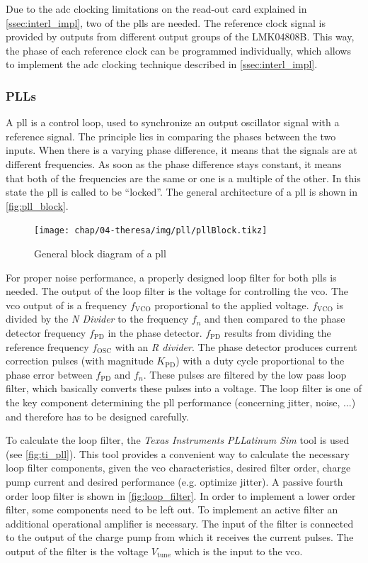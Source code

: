 Due to the \gls{adc} clocking limitations on the read-out card explained in \autoref{ssec:interl_impl}, two of the \glspl{pll} are needed. 
The reference clock signal is provided by outputs from different output groups of the LMK04808B. This way, the phase of each reference clock can be programmed individually, which allows to implement the \gls{adc} clocking technique described in \autoref{ssec:interl_impl}.


\subsubsection*{PLLs}
A \gls{pll} is a control loop, used to synchronize an output oscillator signal with a reference signal.
The principle lies in comparing the phases between the two inputs. 
When there is a varying phase difference, it means that the signals are at different frequencies.
As soon as the phase difference stays constant, it means that both of the frequencies are the same or one is a multiple of the other. 
In this state the \gls{pll} is called to be ``locked''.
The general architecture of a \gls{pll} is shown in \autoref{fig:pll_block}.

\begin{figure}[tbh]
	\centering
	\texttt{[image: chap/04-theresa/img/pll/pllBlock.tikz]}
	\caption[PLL block diagram]{General block diagram of a \gls{pll} \cite{pll_design}}
	\label{fig:pll_block}
\end{figure}

For proper noise performance, a properly designed loop filter for both \glspl{pll} is needed. 
The output of the loop filter is the voltage for controlling the \gls{vco}.
The \gls{vco} output of is a frequency $f_\text{VCO}$ proportional to the applied voltage.
$f_\text{VCO}$ is divided by the \textit{N Divider} to the frequency $f_n$ and then compared to the phase detector frequency $f_\text{PD}$ in the phase detector. 
$f_\text{PD}$ results from dividing the reference frequency $f_\text{OSC}$ with an \textit{R divider}. 
The phase detector produces current correction pulses (with magnitude $K_\text{PD}$) with a duty cycle proportional to the phase error between $f_\text{PD}$ and $f_n$. 
These pulses are filtered by the low pass loop filter, which basically converts these pulses into a voltage. \cite{pll_design}
The loop filter is one of the key component determining the \gls{pll} performance (concerning jitter, noise, ...) and therefore has to be designed carefully.

To calculate the loop filter, the \textit{Texas Instruments} \textit{PLLatinum Sim} tool is used (see \autoref{fig:ti_pll}). 
This tool provides a convenient way to calculate the necessary loop filter components, given the \gls{vco} characteristics, desired filter order, charge pump current and desired performance (e.g. optimize jitter). 
A passive fourth order loop filter is shown in \autoref{fig:loop_filter}.
In order to implement a lower order filter, some components need to be left out.
To implement an active filter an additional operational amplifier is necessary.
The input of the filter is connected to the output of the charge pump from which it receives the current pulses.
The output of the filter is the voltage $V_\text{tune}$ which is the input to the \gls{vco}.



